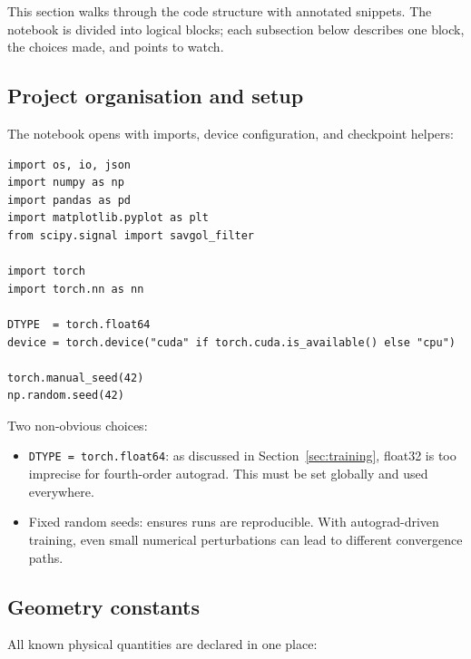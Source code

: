 \documentclass[11pt,a4paper]{article}
\begin{document}
This section walks through the code structure with annotated snippets. The notebook is divided into logical blocks; each subsection below describes one block, the choices made, and points to watch.

\subsection{Project organisation and setup}

The notebook opens with imports, device configuration, and checkpoint helpers:

\begin{lstlisting}[caption={Imports and device setup}]
import os, io, json
import numpy as np
import pandas as pd
import matplotlib.pyplot as plt
from scipy.signal import savgol_filter

import torch
import torch.nn as nn

DTYPE  = torch.float64
device = torch.device("cuda" if torch.cuda.is_available() else "cpu")

torch.manual_seed(42)
np.random.seed(42)
\end{lstlisting}

Two non-obvious choices:
\begin{itemize}[leftmargin=*, itemsep=2pt]
\item \texttt{DTYPE = torch.float64}: as discussed in Section~\ref{sec:training}, float32 is too imprecise for fourth-order autograd. This must be set globally and used everywhere.
\item Fixed random seeds: ensures runs are reproducible. With autograd-driven training, even small numerical perturbations can lead to different convergence paths.
\end{itemize}

\subsection{Geometry constants}

All known physical quantities are declared in one place:
\end{document}
